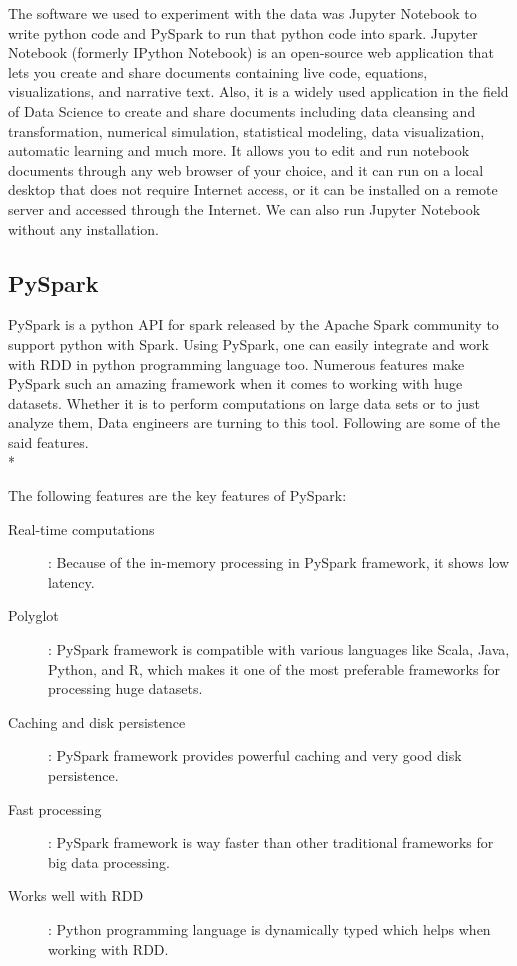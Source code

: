 The software we used to experiment with the data was Jupyter Notebook to write python code and PySpark to run that python code into spark.
Jupyter Notebook (formerly IPython Notebook) is an open-source web application that lets you create and share documents containing live code, equations, visualizations, and narrative text. Also, it is a widely used application in the field of Data Science to create and share documents including data cleansing and transformation, numerical simulation, statistical modeling, data visualization, automatic learning and much more. It allows you to edit and run notebook documents through any web browser of your choice, and it can run on a local desktop that does not require Internet access, or it can be installed on a remote server and accessed through the Internet. We can also run Jupyter Notebook without any installation.

\subsection{PySpark}
PySpark is a python API for spark released by the Apache Spark community to support python with Spark. Using PySpark, one can easily integrate and work with RDD in python programming language too. Numerous features make PySpark such an amazing framework when it comes to working with huge datasets. Whether it is to perform computations on large data sets or to just analyze them, Data engineers are turning to this tool. Following are some of the said features.\\*

\noindent
The following features are the key features of PySpark:

\begin{description}
	\item [Real-time computations]: Because of the in-memory processing in PySpark framework, it shows low latency.
	\item [Polyglot]: PySpark framework is compatible with various languages like Scala, Java, Python, and R, which makes it one of the most preferable frameworks for processing huge datasets.
	\item [Caching and disk persistence]: PySpark framework provides powerful caching and very good disk persistence.
	\item [Fast processing]: PySpark framework is way faster than other traditional frameworks for big data processing.
	\item [Works well with RDD]: Python programming language is dynamically typed which helps when working with RDD.
\end{description}

